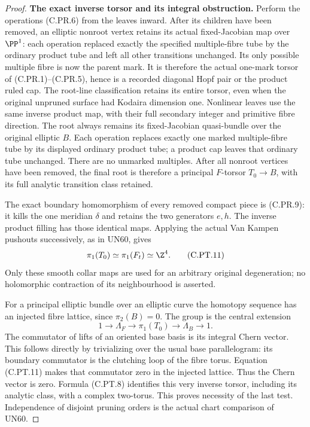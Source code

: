 \begin{proof}
\par\medskip\noindent\textbf{The exact inverse torsor and its integral obstruction.}
Perform the operations (C.PR.6) from the leaves
inward. After its children have been removed,
an elliptic nonroot vertex retains its actual
fixed-Jacobian map over $\PP^1$: each operation
replaced exactly the specified multiple-fibre
tube by the ordinary product tube and left
all other transitions unchanged. Its only
possible multiple fibre is now the parent
mark. It is therefore the actual one-mark
torsor of (C.PR.1)--(C.PR.5), hence is a
recorded diagonal Hopf pair or the product
ruled cap. The root-line classification retains
its entire torsor, even when the original
unpruned surface had Kodaira dimension one.
Nonlinear leaves use the same
inverse product map, with their full
secondary integer and primitive fibre
direction. The root always remains its
fixed-Jacobian quasi-bundle over the original
elliptic $B$. Each operation replaces exactly
one marked multiple-fibre tube by its
displayed ordinary product tube; a product
cap leaves that ordinary tube unchanged.
There are no unmarked multiples. After all
nonroot vertices have been removed, the final
root is therefore a principal $F$-torsor
$T_0\to B$, with its full analytic transition
class retained.

The exact boundary homomorphism of every
removed compact piece is (C.PR.9): it kills
the one meridian $\delta$ and retains the
two generators $e,h$. The inverse product
filling has those identical maps. Applying
the actual Van Kampen pushouts successively,
as in UN60, gives
\[
                         \pi_1(T_0)\simeq\pi_1(F_t)
                                             \simeq\Z^4.
 \tag{C.PT.11}
\]
Only these smooth collar maps are used for
an arbitrary original degeneration; no
holomorphic contraction of its neighbourhood
is asserted.

For a principal elliptic bundle over an
elliptic curve the homotopy sequence has
an injected fibre lattice, since
$\pi_2(B)=0$. The group is the central
extension
\[
 1\longrightarrow\Lambda_F
 \longrightarrow\pi_1(T_0)
 \longrightarrow\Lambda_B\longrightarrow1.
 \tag{C.PT.12}
\]
The commutator of lifts of an oriented
base basis is its integral Chern vector.
This follows directly by trivializing over
the usual base parallelogram: its boundary
commutator is the clutching loop of the
fibre torus. Equation (C.PT.11) makes that
commutator zero in the injected lattice.
Thus the Chern vector is zero. Formula
(C.PT.8) identifies this very inverse
torsor, including its analytic class,
with a complex two-torus. This proves
necessity of the last test. Independence
of disjoint pruning orders is the actual
chart comparison of UN60.


\end{proof}
